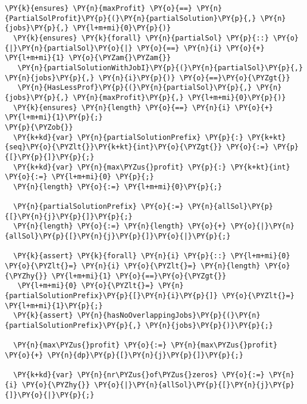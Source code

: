 \begin{Verbatim}[commandchars=\\\{\}, fontsize=\small]
  \PY{k}{ensures} \PY{n}{maxProfit} \PY{o}{==} \PY{n}{PartialSolProfit}\PY{p}{(}\PY{n}{partialSolution}\PY{p}{,} \PY{n}{jobs}\PY{p}{,} \PY{l+m+mi}{0}\PY{p}{)}
  \PY{k}{ensures} \PY{k}{forall} \PY{n}{partialSol} \PY{p}{::} \PY{o}{|}\PY{n}{partialSol}\PY{o}{|} \PY{o}{==} \PY{n}{i} \PY{o}{+} \PY{l+m+mi}{1} \PY{o}{\PYZam{}\PYZam{}}
   \PY{n}{partialSolutionWithJobI}\PY{p}{(}\PY{n}{partialSol}\PY{p}{,} \PY{n}{jobs}\PY{p}{,} \PY{n}{i}\PY{p}{)} \PY{o}{==}\PY{o}{\PYZgt{}}
   \PY{n}{HasLessProf}\PY{p}{(}\PY{n}{partialSol}\PY{p}{,} \PY{n}{jobs}\PY{p}{,} \PY{n}{maxProfit}\PY{p}{,} \PY{l+m+mi}{0}\PY{p}{)}
  \PY{k}{ensures} \PY{n}{length} \PY{o}{==} \PY{n}{i} \PY{o}{+} \PY{l+m+mi}{1}\PY{p}{;}
\PY{p}{\PYZob{}}
  \PY{k+kd}{var} \PY{n}{partialSolutionPrefix} \PY{p}{:} \PY{k+kt}{seq}\PY{o}{\PYZlt{}}\PY{k+kt}{int}\PY{o}{\PYZgt{}} \PY{o}{:=} \PY{p}{[}\PY{p}{]}\PY{p}{;}
  \PY{k+kd}{var} \PY{n}{max\PYZus{}profit} \PY{p}{:} \PY{k+kt}{int} \PY{o}{:=} \PY{l+m+mi}{0} \PY{p}{;}
  \PY{n}{length} \PY{o}{:=} \PY{l+m+mi}{0}\PY{p}{;}

  \PY{n}{partialSolutionPrefix} \PY{o}{:=} \PY{n}{allSol}\PY{p}{[}\PY{n}{j}\PY{p}{]}\PY{p}{;}
  \PY{n}{length} \PY{o}{:=} \PY{n}{length} \PY{o}{+} \PY{o}{|}\PY{n}{allSol}\PY{p}{[}\PY{n}{j}\PY{p}{]}\PY{o}{|}\PY{p}{;}

  \PY{k}{assert} \PY{k}{forall} \PY{n}{i} \PY{p}{::} \PY{l+m+mi}{0} \PY{o}{\PYZlt{}=} \PY{n}{i} \PY{o}{\PYZlt{}=} \PY{n}{length} \PY{o}{\PYZhy{}} \PY{l+m+mi}{1} \PY{o}{==}\PY{o}{\PYZgt{}}
   \PY{l+m+mi}{0} \PY{o}{\PYZlt{}=} \PY{n}{partialSolutionPrefix}\PY{p}{[}\PY{n}{i}\PY{p}{]} \PY{o}{\PYZlt{}=} \PY{l+m+mi}{1}\PY{p}{;} 
  \PY{k}{assert} \PY{n}{hasNoOverlappingJobs}\PY{p}{(}\PY{n}{partialSolutionPrefix}\PY{p}{,} \PY{n}{jobs}\PY{p}{)}\PY{p}{;}

  \PY{n}{max\PYZus{}profit} \PY{o}{:=} \PY{n}{max\PYZus{}profit} \PY{o}{+} \PY{n}{dp}\PY{p}{[}\PY{n}{j}\PY{p}{]}\PY{p}{;}

  \PY{k+kd}{var} \PY{n}{nr\PYZus{}of\PYZus{}zeros} \PY{o}{:=} \PY{n}{i} \PY{o}{\PYZhy{}} \PY{o}{|}\PY{n}{allSol}\PY{p}{[}\PY{n}{j}\PY{p}{]}\PY{o}{|}\PY{p}{;} 


\end{Verbatim}
